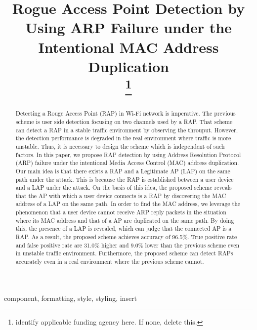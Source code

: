 \documentclass[conference]{IEEEtran}
\begin{document}
\title{Rogue Access Point Detection by Using ARP Failure under the Intentional MAC Address Duplication\\
\thanks{identify applicable funding agency here. If none, delete this.}
}

\author{
\and
}
\maketitle

\begin{abstract}
Detecting a Rouge Access Point (RAP) in Wi-Fi network is imperative.
The previous scheme is user side detection focusing on two channels used by a RAP.
That scheme can detect a RAP in a stable traffic environment by observing the throuput.
However, the detection performance is degraded in the real environment where traffic is more unstable.
Thus, it is necessary to design the scheme which is independent of such factors.
In this paper, we propose RAP detection by using Address Resolution Protocol (ARP) failure under the intentional Media Access Control (MAC) address duplication.
Our main idea is that there exists a RAP and a Legitimate AP (LAP) on the same path under the attack.
This is because the RAP is established between a user device and a LAP under the attack.
On the basis of this idea, the proposed scheme reveals that the AP with which a user device connects is a RAP by discovering the MAC address of a LAP on the same path.
In order to find the MAC address, we leverage the phenomenon that a user device cannot receive ARP reply packets in the situation where its MAC address and that of a AP are duplicated on the same path.
By doing this, the presence of a LAP is revealed, which can judge that the connected AP is a RAP.
As a result, the proposed scheme achieves accuracy of 96.5\%.
True positive rate and false positive rate are 31.0\% higher and 9.0\% lower than the previous scheme even in unstable traffic environment.
Furthermore, the proposed scheme can detect RAPs accurately even in a real environment where the previous scheme cannot.
\end{abstract}

\begin{IEEEkeywords}
component, formatting, style, styling, insert
\end{IEEEkeywords}
\end{document}
